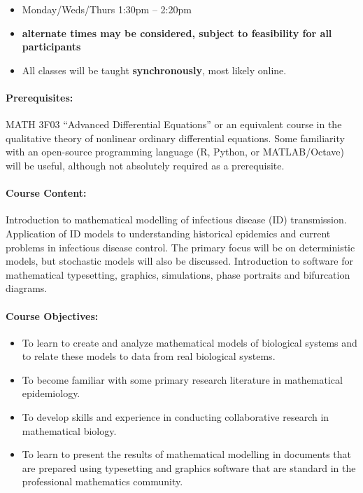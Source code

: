 \documentclass[12pt]{article}
\begin{document}
\begin{itemize}
\item Monday/Weds/Thurs 1:30pm -- 2:20pm
\item \textbf{alternate times may be considered, subject to feasibility for all participants}
\item All classes will be taught \textbf{synchronously}, most likely online.
\end{itemize}

\paragraph*{Prerequisites:} MATH 3F03 ``Advanced Differential Equations'' or an equivalent course in the qualitative theory of nonlinear ordinary differential equations. Some familiarity with an open-source programming language (R, Python, or MATLAB/Octave) will be useful, although not absolutely required as a prerequisite.

\paragraph*{Course Content:}
Introduction to mathematical modelling of infectious disease (ID) transmission.  Application of ID models to understanding historical epidemics and current problems in infectious disease control.  The primary focus will be on deterministic models, but stochastic models will also be discussed.   Introduction to software for mathematical typesetting, graphics, simulations, phase portraits and bifurcation diagrams.

\paragraph*{Course Objectives:}

\begin{itemize}
\item To learn to create and analyze mathematical models of biological systems and to relate these models to data from real biological systems.  
\item To become familiar with some primary research literature in mathematical epidemiology.
\item To develop skills and experience in conducting collaborative research in mathematical biology.
\item To learn to present the results of mathematical modelling in documents that are prepared using typesetting and graphics software that are standard in the professional mathematics community.
\end{itemize}
\end{document}

